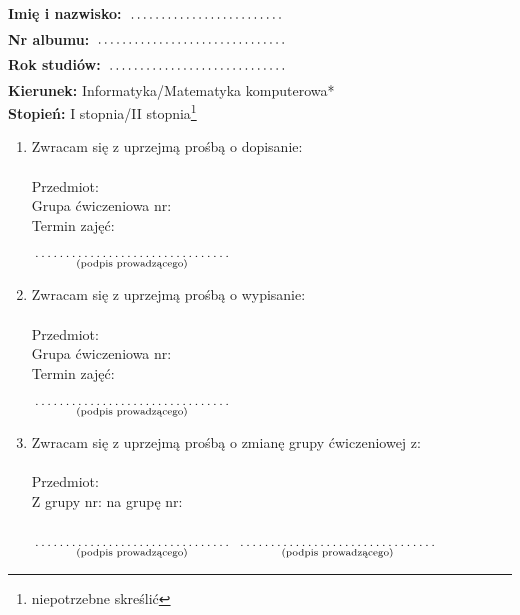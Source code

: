 \documentclass[a4paper,11pt]{article}
\newcommand{\fillField}[2]{
    $\underset{\text{#1}}{\parbox[t]{#2}{\dotfill}}$
}
\begin{document}
\noindent
\textbf{Imię i nazwisko:}   \fillField{}{4cm}\\
\textbf{Nr albumu:}   \fillField{}{4.9cm}\\
\textbf{Rok studiów:} \fillField{}{4.6cm}\\
\textbf{Kierunek:} Informatyka/Matematyka komputerowa*\\
\textbf{Stopień:} I stopnia/II stopnia\footnote[1]{niepotrzebne skreślić}

\vskip 2.0cm

\begin{enumerate}
    \item Zwracam się z uprzejmą prośbą o dopisanie: \\\\
    Przedmiot: \dotfill\\
    Grupa ćwiczeniowa nr: \dotfill\\
    Termin zajęć: \dotfill\\\\

    \hspace{\fill} \fillField{(podpis prowadzącego)}{5cm} \hspace{2.0cm}

    \vskip 1.0cm

    \item Zwracam się z uprzejmą prośbą o wypisanie: \\\\
    Przedmiot: \dotfill\\
    Grupa ćwiczeniowa nr: \dotfill\\
    Termin zajęć: \dotfill\\\\

    \hspace{\fill} \fillField{(podpis prowadzącego)}{5cm} \hspace{2.0cm}

    \vskip 1.0cm

    \item Zwracam się z uprzejmą prośbą o zmianę grupy ćwiczeniowej z: \\\\
    Przedmiot: \dotfill\\
    Z grupy nr: \dotfill na grupę nr: \dotfill\\\\

    \fillField{(podpis prowadzącego)}{5cm} \hspace{5.0cm} \fillField{(podpis prowadzącego)}{5cm}

\end{enumerate}
\end{document}
